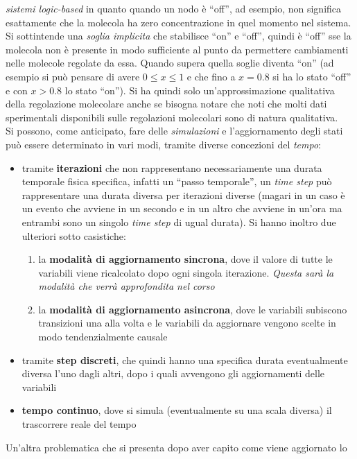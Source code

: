 \documentclass[a4paper,12pt, oneside]{book}
\begin{document}
\textit{sistemi logic-based} in quanto quando un nodo è ``off'', ad esempio, non
significa esattamente che la molecola ha zero concentrazione in quel momento nel
sistema. Si sottintende una \textit{soglia implicita} che stabilisce ``on''  e
``off'', quindi è ``off'' sse la molecola non è presente in modo
sufficiente al punto da permettere cambiamenti nelle molecole regolate da
essa. Quando supera quella soglie diventa ``on'' (ad esempio si può pensare di
avere $0\leq x\leq 1$ e che fino a $x=0.8$ si ha lo stato ``off'' e con $x>0.8$
lo stato ``on''). Si ha quindi solo
un'approssimazione qualitativa della regolazione molecolare anche se bisogna
notare che noti che molti dati sperimentali disponibili sulle regolazioni
molecolari sono di natura qualitativa. \\
Si possono, come anticipato, fare delle \textit{simulazioni} e l'aggiornamento
degli stati può essere determinato in vari modi, tramite diverse concezioni del \textit{tempo}:
\begin{itemize}
  \item tramite \textbf{iterazioni} che non rappresentano necessariamente una
  durata temporale fisica specifica, infatti un ``passo temporale'', un
  \textit{time step} può rappresentare una durata diversa per iterazioni diverse
  (magari in un caso è un evento che avviene in un secondo e in un altro che
  avviene in un'ora ma entrambi sono un singolo \textit{time step} di ugual
  durata). Si hanno inoltro due ulteriori sotto casistiche:
  \begin{enumerate}
    \item la \textbf{modalità di aggiornamento sincrona}, dove il valore di
    tutte le variabili viene ricalcolato dopo ogni singola
    iterazione. \textit{Questa sarà la modalità che verrà approfondita nel
      corso}  
    \item la \textbf{modalità di aggiornamento asincrona}, dove le variabili
    subiscono transizioni una alla volta e le variabili da aggiornare vengono
    scelte in modo tendenzialmente causale
  \end{enumerate}
  \item tramite \textbf{step discreti}, che quindi hanno una specifica durata
  eventualmente diversa l'uno dagli altri, dopo i quali avvengono gli
  aggiornamenti delle variabili
  \item \textbf{tempo continuo}, dove si simula (eventualmente su una scala
  diversa) il trascorrere reale del tempo
\end{itemize}
Un'altra problematica che si presenta dopo aver capito come viene aggiornato lo
\end{document}

